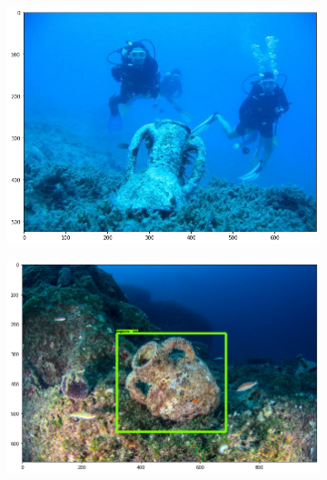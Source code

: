 \documentclass[a4paper, 11pt, oneside]{article}
\begin{document}
  \begin{figure}[ht]
    \centering
    \begin{subfigure}[ht]{0.4\textwidth}
        \centering
        \includegraphics[width=\textwidth]{val_1.png}
    \end{subfigure}
    \begin{subfigure}[ht]{0.4\textwidth}
        \centering
        \includegraphics[width=\textwidth]{val_6.png}
    \end{subfigure}
    \bigskip
    \begin{subfigure}[ht]{0.4\textwidth}
        \centering

\end{subfigure}
\end{figure}
\end{document}

